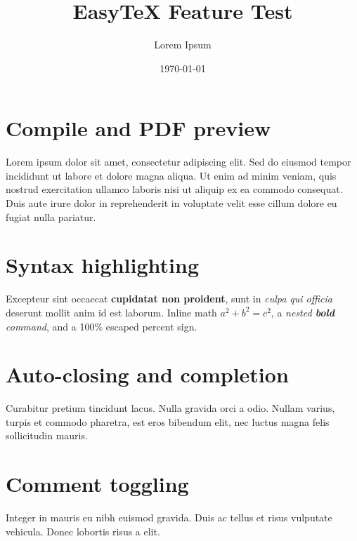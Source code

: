 \documentclass[11pt,a4paper]{article}
\title{EasyTeX Feature Test}
\author{Lorem Ipsum}
\date{\today}
\begin{document}
\maketitle
\tableofcontents
\newpage

\section{Compile and PDF preview}\label{sec:compile}
Lorem ipsum dolor sit amet, consectetur adipiscing elit. Sed do eiusmod tempor
incididunt ut labore et dolore magna aliqua. Ut enim ad minim veniam, quis
nostrud exercitation ullamco laboris nisi ut aliquip ex ea commodo consequat.
Duis aute irure dolor in reprehenderit in voluptate velit esse cillum dolore eu
fugiat nulla pariatur.

\section{Syntax highlighting}\label{sec:highlight}
Excepteur sint occaecat \textbf{cupidatat non proident}, sunt in \emph{culpa qui
officia} deserunt mollit anim id est laborum. Inline math $a^2 + b^2 = c^2$,
a \textit{nested \textbf{bold} command}, and a 100\% escaped percent sign.

\section{Auto-closing and completion}\label{sec:completion}
Curabitur pretium tincidunt lacus. Nulla gravida orci a odio. Nullam varius,
turpis et commodo pharetra, est eros bibendum elit, nec luctus magna felis
sollicitudin mauris.

\section{Comment toggling}\label{sec:comments}
Integer in mauris eu nibh euismod gravida. Duis ac tellus et risus vulputate
vehicula. Donec lobortis risus a elit.
\end{document}

